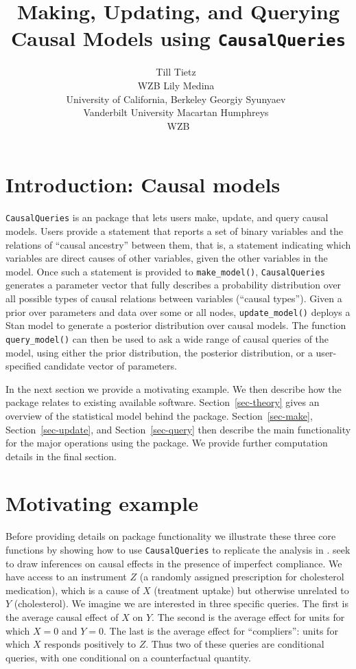 \documentclass[
  11pt,
  article]{jss}
\author{Till Tietz~\orcidlink{0000-0002-2916-9059}\\WZB \And Lily
Medina~\orcidlink{0009-0004-2423-524X}\\University of California,
Berkeley \AND Georgiy
Syunyaev~\orcidlink{0000-0002-4391-6313}\\Vanderbilt
University \And Macartan Humphreys~\orcidlink{0000-0001-7029-2326}\\WZB}
\title{Making, Updating, and Querying Causal Models using
\texttt{CausalQueries}}
\begin{document}
\maketitle

\section{Introduction: Causal models}\label{sec-intro}

\texttt{CausalQueries} is an  package that lets users make,
update, and query causal models. Users provide a statement that reports
a set of binary variables and the relations of ``causal ancestry''
between them, that is, a statement indicating which variables are direct
causes of other variables, given the other variables in the model. Once
such a statement is provided to \texttt{make\_model()},
\texttt{CausalQueries} generates a parameter vector that fully describes
a probability distribution over all possible types of causal relations
between variables (``causal types''). Given a prior over parameters and
data over some or all nodes, \texttt{update\_model()} deploys a Stan
\citep{carpenter_stan_2017} model to generate a posterior distribution
over causal models. The function \texttt{query\_model()} can then be
used to ask a wide range of causal queries of the model, using either
the prior distribution, the posterior distribution, or a user-specified
candidate vector of parameters.

In the next section we provide a motivating example. We then describe
how the package relates to existing available software.
Section~\ref{sec-theory} gives an overview of the statistical model
behind the package. Section~\ref{sec-make}, Section~\ref{sec-update},
and Section~\ref{sec-query} then describe the main functionality for the
major operations using the package. We provide further computation
details in the final section.

\section{Motivating example}\label{motivating-example}

Before providing details on package functionality we illustrate these
three core functions by showing how to use \texttt{CausalQueries} to
replicate the analysis in
\citetext{\citealp{chickering_clinicians_1996}; \citealp[see
also][]{humphreys_integrated_2023}}. \citet{chickering_clinicians_1996}
seek to draw inferences on causal effects in the presence of imperfect
compliance. We have access to an instrument \(Z\) (a randomly assigned
prescription for cholesterol medication), which is a cause of \(X\)
(treatment uptake) but otherwise unrelated to \(Y\) (cholesterol). We
imagine we are interested in three specific queries. The first is the
average causal effect of \(X\) on \(Y\). The second is the average
effect for units for which \(X=0\) and \(Y=0\). The last is the average
effect for ``compliers'': units for which \(X\) responds positively to
\(Z\). Thus two of these queries are conditional queries, with one
conditional on a counterfactual quantity.
\end{document}
